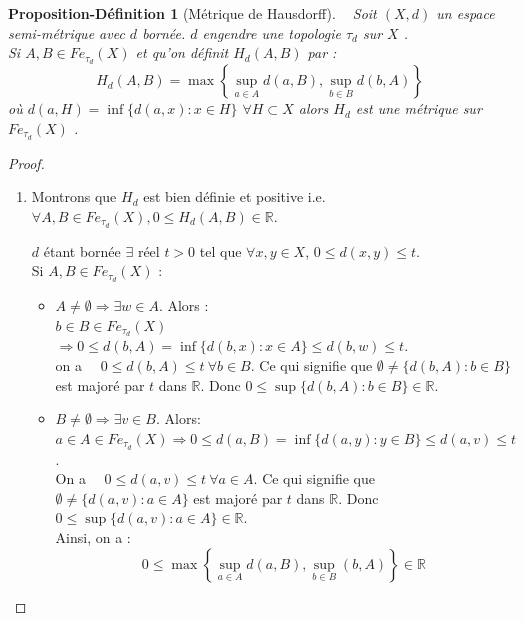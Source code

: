 \documentclass[11pt]{report}
\newenvironment{boxdefinition}
{\begin{tcolorbox}
		[enhanced jigsaw,breakable,pad at break*=1mm,
		colback=black!5!white,boxrule=0pt,frame hidden,
		borderline west={1.5mm}{-2mm}{blue}]}
	{\end{tcolorbox}}
\theoremstyle{styletheorem}
\theoremstyle{styledef}
\newtheorem{propozition}[theoreme]{Proposition-Définition}
\theoremstyle{remark}
\newenvironment{propdf}{\vspace*{0.3cm}\begin{boxdefinition}\begin{propozition}}{\end{propozition}\end{boxdefinition}\vspace*{0.3cm}}
\begin{document}
\begin{propdf}[Métrique de Hausdorff]\label{born1}\  \newline
	Soit $(X,d)$ un espace semi-métrique avec $d$ bornée. $d$ engendre une topologie $\tau_d$ sur $X$ \cite{b9}.\\
	Si $A,B \in Fe_{\tau_d} (X)$ et qu'on définit $H_{d}(A,B)$ par :
	$$H_{d}(A,B) = \max \left\lbrace \sup_{a \in A} d(a,B), \sup_{b \in B} d(b,A) \right\rbrace $$ où $ d(a,H) = \inf \lbrace d(a,x) : x \in H \rbrace$ $\forall H \subset X $ alors $H_d$ est une métrique sur $Fe_{\tau_d} (X)$ \cite{b7}.
\end{propdf}
\begin{proof}\ 
	\newline\ 
	\begin{enumerate}
		
		\item Montrons que $H_d$ est bien définie et positive i.e. $\forall A,B \in Fe_{\tau_{d}}(X), 0 \leq H_d (A,B) \in \mathbb{R}$.
		
		$d$ étant bornée $\exists $ réel $t>0$ tel que $\forall x,y \in X $, $0 \leq d(x,y) \leq t$.\\
		Si $A, B\in Fe_{\tau_{d}}(X)$ :
		\begin{itemize}
			\item $A \neq \emptyset \Rightarrow \exists w \in A$. Alors : \\ 
			$b \in B \in Fe_{\tau_{d}}(X)$ $\Rightarrow 0 \leq d(b,A) = \inf \lbrace d(b,x) : x \in A \rbrace \leq d(b,w) \leq t$.\\
			on a~~ $0 \leq d(b,A) \leq t \  \forall b \in B$. Ce qui signifie que $\emptyset \neq \lbrace d(b,A) : b \in B \rbrace$ est  majoré  par $t$ dans $\mathbb{R}$. Donc $0 \leq \sup \lbrace d(b,A) : b \in B \rbrace \in \mathbb{R}$.
			
			\item $B \neq \emptyset \Rightarrow \exists v \in B $. Alors:\\ 
			$a \in A \in Fe_{\tau_{d}}(X) \Rightarrow 0 \leq d(a,B) = \inf \lbrace d(a,y) : y \in B \rbrace \leq d(a,v) \leq t $.\\  
			On a~~ $0 \leq d(a,v) \leq t \ \forall a \in A$. Ce qui signifie que  $\emptyset \neq \lbrace d(a,v) : a \in A \rbrace$ est majoré par $t$ dans  $\mathbb{R} $. Donc $0 \leq \sup \lbrace d(a,v) : a \in A \rbrace \in \mathbb{R}$.\\
			
			Ainsi, on a :
			$$0 \leq \max \left\lbrace \sup_{a \in A} d(a,B), \sup_{b \in B} (b,A) \right\rbrace \in \mathbb{R}$$
			

\end{itemize}
\end{enumerate}
\end{proof}
\end{document}
